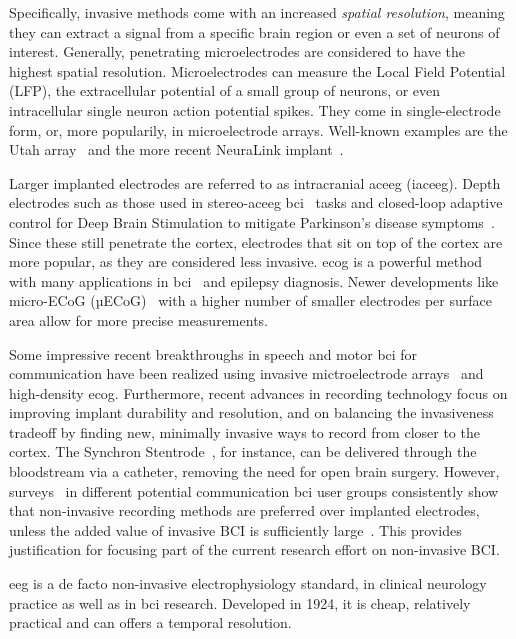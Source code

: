 Specifically, invasive methods come with an increased \emph{spatial resolution},
meaning they can extract a signal from a specific brain region or even a set of
neurons of interest.
Generally, penetrating microelectrodes are considered to have the highest
spatial resolution.
Microelectrodes can measure the Local Field Potential (LFP), the extracellular
potential of a small group of neurons, or even intracellular single neuron
action potential spikes.
They come in single-electrode form, or, more popularily, in microelectrode
arrays.
Well-known examples are the Utah array~\cite{Maynard1997} and the more recent
NeuraLink implant~\cite{Musk2019}.

Larger implanted electrodes are referred to as intracranial ac{eeg} (iac{eeg}).
Depth electrodes such as those used in stereo-ac{eeg} \ac{bci}~\cite{Wu2024} tasks
and closed-loop adaptive control for Deep Brain Stimulation to mitigate
Parkinson's disease symptoms~\cite{Arlotti2018}.
Since these still penetrate the cortex, electrodes that sit on top of the
cortex are more popular, as they are considered less invasive.
\ac{ecog} is a powerful method
with many applications in \ac{bci}~\cite{Schalk2011} and epilepsy diagnosis.
Newer developments like micro-ECoG (µECoG)~\cite{Shokoueinejad2019} with a
higher number of smaller electrodes per surface area allow for more precise
measurements.

Some impressive recent breakthroughs in speech and motor \ac{bci} for communication
 have been realized using
invasive mictroelectrode arrays~\cite{Willett2021} and high-density
\Ac{ecog}\cite{Metzger2023}.
Furthermore, recent advances in recording technology focus on improving implant
durability and resolution, and on balancing the invasiveness
tradeoff by finding new, minimally invasive ways to record from closer to the cortex.
The Synchron Stentrode~\cite{Mitchell2023}, for instance, can be delivered
through the bloodstream via a catheter, removing the need for open brain
surgery.
However, surveys~\cite{Huggins2011, Huggins2015, Branco2021} in different
potential communication \ac{bci} user groups consistently show that non-invasive
recording methods are preferred over implanted electrodes, unless the added value of invasive BCI is
sufficiently large~\cite{Kageyama2020}.
This provides justification for focusing part of the current research effort on
non-invasive BCI.

\Ac{eeg} is a de facto non-invasive electrophysiology standard, in clinical
neurology practice as well as in \ac{bci} research.
Developed in 1924, it is cheap, relatively practical and can offers a
temporal resolution.

